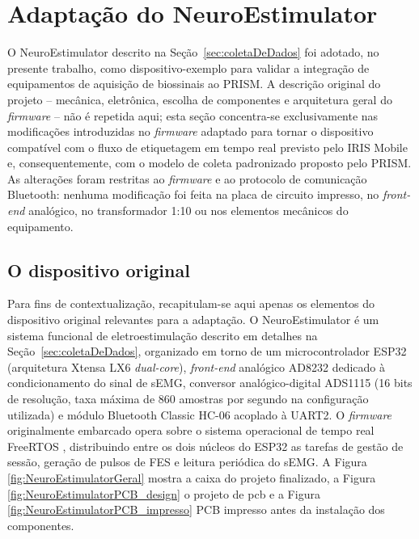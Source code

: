\section{Adaptação do NeuroEstimulator}\label{sec:adaptacaoNeuroEstimulator}

O NeuroEstimulator descrito na Seção~\ref{sec:coletaDeDados} foi adotado, no presente trabalho, como dispositivo-exemplo para validar a integração de equipamentos de aquisição de biossinais ao PRISM. A descrição original do projeto -- mecânica, eletrônica, escolha de componentes e arquitetura geral do \textit{firmware} -- não é repetida aqui; esta seção concentra-se exclusivamente nas modificações introduzidas no \textit{firmware} adaptado \cite{prismNeuroEstimulatorRepo} para tornar o dispositivo compatível com o fluxo de etiquetagem em tempo real previsto pelo IRIS Mobile e, consequentemente, com o modelo de coleta padronizado proposto pelo PRISM. As alterações foram restritas ao \textit{firmware} e ao protocolo de comunicação Bluetooth: nenhuma modificação foi feita na placa de circuito impresso, no \textit{front-end} analógico, no transformador 1:10 ou nos elementos mecânicos do equipamento.

\subsection{O dispositivo original}\label{subsec:NEOriginal}

Para fins de contextualização, recapitulam-se aqui apenas os elementos do dispositivo original relevantes para a adaptação. O NeuroEstimulator é um sistema funcional de eletroestimulação descrito em detalhes na Seção~\ref{sec:coletaDeDados}, organizado em torno de um microcontrolador ESP32 (arquitetura Xtensa LX6 \textit{dual-core}), \textit{front-end} analógico AD8232 dedicado à condicionamento do sinal de sEMG, conversor analógico-digital ADS1115 (16 bits de resolução, taxa máxima de 860 amostras por segundo na configuração utilizada) e módulo Bluetooth Classic HC-06 acoplado à UART2. O \textit{firmware} originalmente embarcado opera sobre o sistema operacional de tempo real FreeRTOS \cite{freRTOSDoc}, distribuindo entre os dois núcleos do ESP32 as tarefas de gestão de sessão, geração de pulsos de FES e leitura periódica do sEMG. A Figura \ref{fig:NeuroEstimulatorGeral} mostra a caixa do projeto finalizado, a Figura \ref{fig:NeuroEstimulatorPCB_design} o projeto de \gls{pcb} e a Figura \ref{fig:NeuroEstimulatorPCB_impresso} PCB impresso antes da instalação dos componentes.



